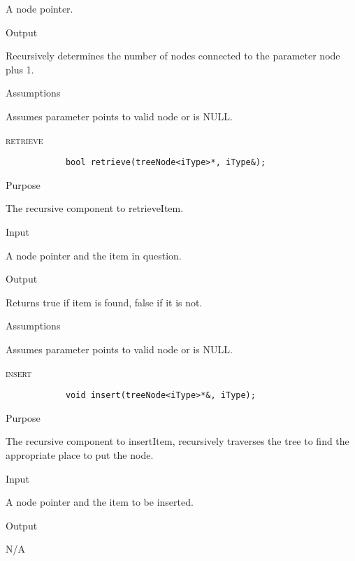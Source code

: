 \documentclass[pdftex, 12pt]{article}
\begin{document}
\begin{description}
\begin{description}
				A node pointer.

			\item{Output}

				Recursively determines the number of nodes connected to the parameter node plus 1.

			\item{Assumptions}

				Assumes parameter points to valid node or is NULL.

		\end{description}
	\item{\textsc{retrieve}}
		\begin{lstlisting}
			bool retrieve(treeNode<iType>*, iType&);
		\end{lstlisting}
		\begin{description}

			\item{Purpose}

				The recursive component to retrieveItem.

			\item{Input}

				A node pointer and the item in question.

			\item{Output}

				Returns true if item is found, false if it is not.

			\item{Assumptions}

				Assumes parameter points to valid node or is NULL.

		\end{description}
	\item{\textsc{insert}}
		\begin{lstlisting}
			void insert(treeNode<iType>*&, iType);
		\end{lstlisting}
		\begin{description}

			\item{Purpose}

				The recursive component to insertItem, recursively traverses the tree to find the appropriate place to
				put the node.

			\item{Input}

				A node pointer and the item to be inserted.
				
			\item{Output}

				N/A


\end{description}
\end{description}
\end{document}
